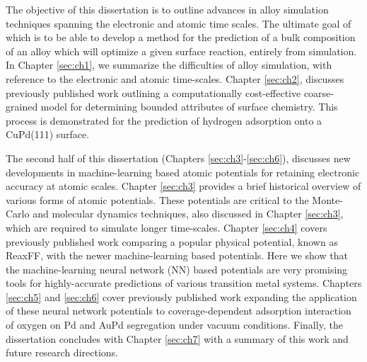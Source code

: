 \documentclass[12pt]{cmuthesis}
\begin{document}
The objective of this dissertation is to outline advances in alloy simulation techniques spanning the electronic and atomic time scales. The ultimate goal of which is to be able to develop a method for the prediction of a bulk composition of an alloy which will optimize a given surface reaction, entirely from simulation. In Chapter \ref{sec:ch1}, we summarize the difficulties of alloy simulation, with reference to the electronic and atomic time-scales. Chapter \ref{sec:ch2}, discusses previously published work \cite{boes-2015-estim-bulk} outlining a computationally cost-effective coarse-grained model for determining bounded attributes of surface chemistry. This process is demonstrated for the prediction of hydrogen adsorption onto a CuPd(111) surface.

The second half of this dissertation (Chapters \ref{sec:ch3}-\ref{sec:ch6}), discusses new developments in machine-learning based atomic potentials for retaining electronic accuracy at atomic scales. Chapter \ref{sec:ch3} provides a brief historical overview of various forms of atomic potentials. These potentials are critical to the Monte-Carlo and molecular dynamics techniques, also discussed in Chapter \ref{sec:ch3}, which are required to simulate longer time-scales. Chapter \ref{sec:ch4} covers previously published work \cite{boes-2016-neural-networ} comparing a popular physical potential, known as ReaxFF, with the newer machine-learning based potentials. Here we show that the machine-learning neural network (NN) based potentials \cite{behler-2007-gener-neural} are very promising tools for highly-accurate predictions of various transition metal systems. Chapters \ref{sec:ch5} and \ref{sec:ch6} cover previously published work \cite{boes-2017-neural-networ,boes-2017-model-segreg} expanding the application of these neural network potentials to coverage-dependent adsorption interaction of oxygen on Pd and AuPd segregation under vacuum conditions. Finally, the dissertation concludes with Chapter \ref{sec:ch7} with a summary of this work and future research directions.
\end{document}
